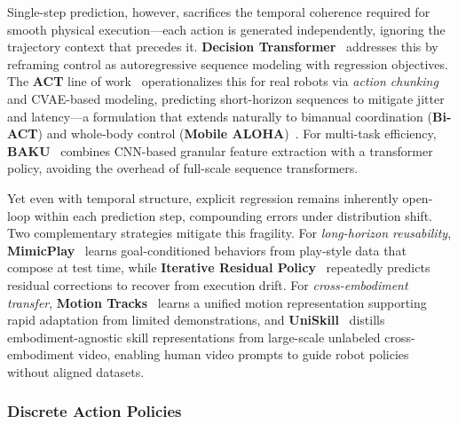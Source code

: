 \documentclass[acmsmall,screen,review,anonymous]{acmart}
\begin{document}
Single-step prediction, however, sacrifices the temporal coherence required for smooth physical execution---each action is generated independently, ignoring the trajectory context that precedes it. \textbf{Decision Transformer}~\cite{chen2021decisiontransformer} addresses this by reframing control as autoregressive sequence modeling with regression objectives. The \textbf{ACT} line of work~\cite{zhao2023learning} operationalizes this for real robots via \emph{action chunking} and CVAE-based modeling, predicting short-horizon sequences to mitigate jitter and latency---a formulation that extends naturally to bimanual coordination (\textbf{Bi-ACT}) and whole-body control (\textbf{Mobile ALOHA})~\cite{fu2024mobile}. For multi-task efficiency, \textbf{BAKU}~\cite{haldar2024baku} combines CNN-based granular feature extraction with a transformer policy, avoiding the overhead of full-scale sequence transformers.

Yet even with temporal structure, explicit regression remains inherently open-loop within each prediction step, compounding errors under distribution shift. Two complementary strategies mitigate this fragility. For \emph{long-horizon reusability}, \textbf{MimicPlay}~\cite{wang2023mimicplay} learns goal-conditioned behaviors from play-style data that compose at test time, while \textbf{Iterative Residual Policy}~\cite{chi2022iterativeresidualpolicy} repeatedly predicts residual corrections to recover from execution drift. For \emph{cross-embodiment transfer}, \textbf{Motion Tracks}~\cite{ren2025motion_tracks} learns a unified motion representation supporting rapid adaptation from limited demonstrations, and \textbf{UniSkill}~\cite{kim2025uniskill} distills embodiment-agnostic skill representations from large-scale unlabeled cross-embodiment video, enabling human video prompts to guide robot policies without aligned datasets.

\subsubsection{Discrete Action Policies}\label{sec:discrete_action_policies}
\end{document}
